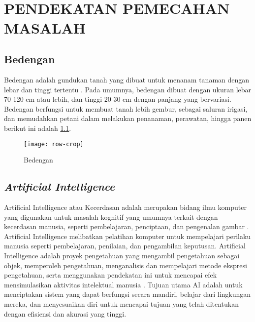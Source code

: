 
\chapter[PENDEKATAN PEMECAHAN MASALAH]{\\ PENDEKATAN PEMECAHAN MASALAH}

\section{Bedengan}
Bedengan adalah gundukan tanah yang dibuat untuk menanam tanaman dengan lebar dan tinggi tertentu \cite{kurniawan2024pengaruh}. Pada umumnya, bedengan dibuat dengan ukuran lebar 70-120 cm atau lebih, dan tinggi 20-30 cm dengan panjang yang bervariasi. Bedengan berfungsi untuk membuat tanah lebih gembur, sebagai saluran irigasi, dan memudahkan petani dalam melakukan penanaman, perawatan, hingga panen \cite{hariatimodifikasi} berikut ini adalah \cref{fig:bedengan}. 
\begin{figure}[H]
	\centering
	\texttt{[image: row-crop]}
	\caption{Bedengan}
	\label{fig:bedengan}
\end{figure}

\section{\textit{Artificial Intelligence}}
Artificial Intelligence atau Kecerdasan adalah merupakan bidang ilmu komputer yang digunakan untuk  masalah kognitif yang umumnya terkait dengan kecerdasan manusia, seperti pembelajaran, penciptaan, dan pengenalan gambar \cite{amazonKecerdasanBuatan}. Artificial Intelligence  melibatkan pelatihan komputer untuk mempelajari perilaku manusia seperti pembelajaran, penilaian, dan pengambilan keputusan. Artificial Intelligence adalah proyek pengetahuan yang mengambil pengetahuan sebagai objek, memperoleh pengetahuan, menganalisis dan mempelajari metode ekspresi pengetahuan, serta menggunakan pendekatan ini untuk mencapai efek mensimulasikan aktivitas intelektual manusia \cite{zhang2021study}. Tujuan utama AI adalah untuk menciptakan sistem yang dapat berfungsi secara mandiri, belajar dari lingkungan mereka, dan menyesuaikan diri untuk mencapai tujuan yang telah ditentukan dengan efisiensi dan akurasi yang tinggi.

